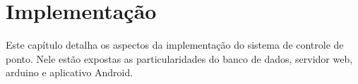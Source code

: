 \chapter{Implementação}
\label{implementacao}

Este capítulo detalha os aspectos da implementação do sistema de controle de ponto. Nele estão expostas as particularidades do banco de dados, servidor web, arduino e aplicativo Android.




